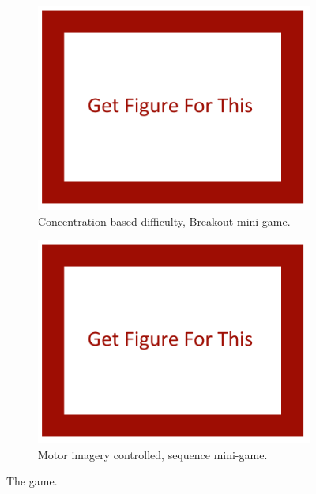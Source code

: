 \documentclass[11pt, a4paper]{article}
\begin{document}
\begin{figure}[h!]
	\centering
	\begin{subfigure}[b]{0.45\linewidth}
		\includegraphics[width = \linewidth] {[ Figures ]/Get Figure.png}
		\caption{Concentration based difficulty, Breakout mini-game.}
		\label{fig:the_game_1}
	\end{subfigure}
	\begin{subfigure}[b]{0.45\linewidth}
		\includegraphics[width = \linewidth] {[ Figures ]/Get Figure.png}
		\caption{Motor imagery controlled, sequence mini-game.}
		\label{fig:the_game_2}
	\end{subfigure}
	\caption{The game.}
	\label{fig:the_game}
\end{figure}
\end{document}

